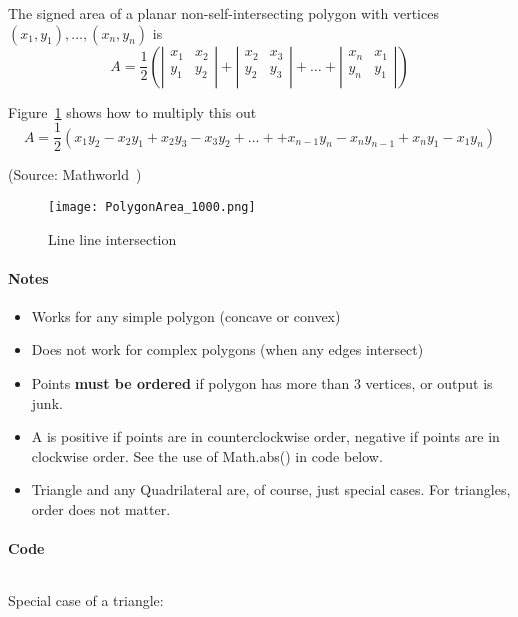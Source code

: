 The signed area of a planar non-self-intersecting polygon with vertices $(x_1, y_1), \dots, (x_n, y_n)$ is
\[
    A = \frac{1}{2} \left(
        \left\vert
        \begin{array}{cc}
            x_1 & x_2 \\
            y_1 & y_2 \\
        \end{array}
        \right\vert
        +
        \left\vert
        \begin{array}{cc}
            x_2 & x_3 \\
            y_2 & y_3 \\
        \end{array}
        \right\vert
        + \ldots +
        \left\vert
        \begin{array}{cc}
            x_n & x_1 \\
            y_n & y_1 \\
        \end{array}
        \right\vert
        \right)
\]

Figure~\ref{fig:polygonareadeterminant} shows how to multiply this out
\[
    A = \frac{1}{2} \left(
        x_1 y_2 - x_2 y_1
      + x_2 y_3 - x_3 y_2
      + \ldots +
      + x_{n-1} y_n - x_n y_{n-1}
      + x_{n} y_1 - x_1 y_n
      \right)
\]

(Source: Mathworld~\cite{mathworldpolygonarea})

\begin{figure}
    \centering
    \texttt{[image: PolygonArea\_1000.png]}
    \caption{Line line intersection}
    \label{fig:polygonareadeterminant}
\end{figure}

\paragraph{Notes}
\begin{itemize}
\item Works for any simple polygon (concave or convex)
\item Does not work for complex polygons (when any edges intersect)
\item Points \textbf{must be ordered} if polygon has more than 3 vertices, or output is junk.
\item A is positive if points are in counterclockwise order, negative if points are in clockwise order.
    See the use of Math.abs() in code below.
\item Triangle and any Quadrilateral are, of course, just special cases.
    For triangles, order does not matter.
\end{itemize}

\paragraph{Code}
\inputminted[fontsize=\footnotesize,linenos=true]{java}{code/polygonarea.java}

Special case of a triangle:

\inputminted[fontsize=\footnotesize,linenos=true]{java}{code/triangleareacoord.java}

